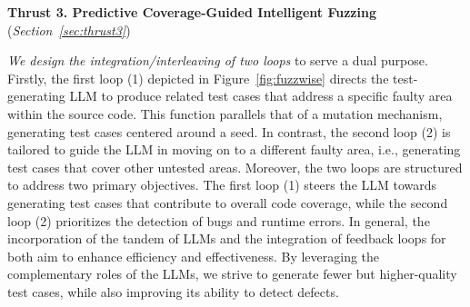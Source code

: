 

\vspace{3pt}
\noindent \textbf{Thrust 3. Predictive Coverage-Guided Intelligent Fuzzing}  ({\em Section~\ref{sec:thrust3}})

{\em We design the integration/interleaving of two loops} to serve a
dual purpose. Firstly, the first loop (1) depicted in
Figure~\ref{fig:fuzzwise} directs the test-generating LLM to produce
related test cases that address a specific faulty area within the
source code. This function parallels that of a mutation mechanism,
generating test cases centered around a seed. In contrast, the
second loop (2) is tailored to guide the LLM in moving on to a
different faulty area, i.e., generating test cases that cover other
untested areas. Moreover, the two loops are structured to address
two primary objectives. The first loop (1) steers the LLM towards
generating test cases that contribute to overall code coverage, while
the second loop (2) prioritizes the detection of bugs and runtime
errors. In general, the incorporation of the tandem of LLMs and the
integration of feedback loops for both aim to enhance efficiency
and effectiveness. By leveraging the
complementary roles of the LLMs, we strive to generate
fewer but higher-quality test cases, while also improving its ability
to detect defects.



